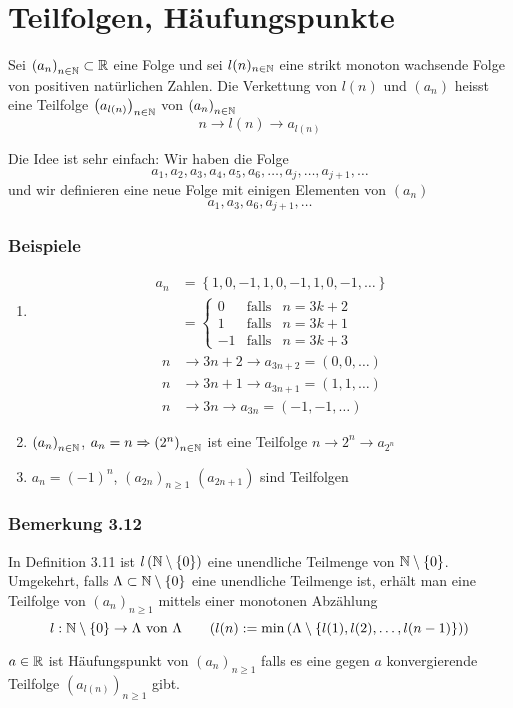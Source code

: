 \section{Teilfolgen, Häufungspunkte}
\begin{definition}{3.11}
Sei $\left( a_n\right)_{n\in\mathbb{N}}\subset\mathbb{R}$ eine Folge und sei $l(n)_{n\in\mathbb{N}}$ eine strikt monoton wachsende Folge von positiven natürlichen Zahlen. Die Verkettung von $l(n)$ und $\left( a_n\right)$ heisst eine Teilfolge $\left( a_{l(n)}\right)_{n\in\mathbb{N}}$ von $\left( a_{n}\right)_{n\in\mathbb{N}}$
\[n\to l(n)\to a_{l(n)}\]
\end{definition}
Die Idee ist sehr einfach: Wir haben die Folge \[a_1,a_2,a_3,a_4,a_5,a_6,\dots,a_j,\dots,a_{j+1},\dots \]
und wir definieren eine neue Folge mit einigen Elementen von $\left( a_n\right)$
\[a_1,a_3,a_6,a_{j+1},\dots \]

\subsubsection*{Beispiele}
\begin{enumerate}
\item \begin{align*}
{a_n} &=\left\{ {1,0, - 1,1,0, - 1,1,0, - 1, \ldots } \right\}\\
 &=\left\{ {\begin{array}{*{20}{c}}
0&{{\text{falls}}}&{n = 3k + 2}\\
1&{{\text{falls}}}&{n = 3k + 1}\\
{ - 1}&{{\text{falls}}}&{n = 3k + 3}
\end{array}} \right.
\end{align*}
\begin{align*}
n&\to 3n + 2 \to {a_{3n + 2}} = \left( {0,0, \ldots } \right)\\
n&\to 3n + 1 \to {a_{3n + 1}} = \left( {1,1, \ldots } \right)\\
n&\to 3n \to {a_{3n}} = \left( { - 1, - 1, \ldots } \right)
\end{align*}
\item $\left( a_n\right)_{n\in\mathbb{N}}$, $a_n=n\Rightarrow \left( 2^n\right)_{n\in\mathbb{N}}$ ist eine Teilfolge $n\to 2^n\to a_{2^n}$
\item $a_n=\left( -1\right)^n$, $\left( a_{2n}\right)_{n\geq 1}$ $\left( a_{2n+1}\right)$ sind Teilfolgen
\end{enumerate}

\subsubsection*{Bemerkung 3.12}
In Definition 3.11 ist $l\left( \mathbb{N}\setminus\{ 0\}\right)$ eine unendliche Teilmenge von $\mathbb{N}\setminus\{ 0\}$. Umgekehrt, falls $\Lambda\subset\mathbb{N}\setminus\{ 0\}$ eine unendliche Teilmenge ist, erhält man eine Teilfolge von $\left( a_n\right)_{n\geq 1}$ mittels einer monotonen Abzählung \[l:\mathbb{N}\setminus\{ 0\}\to\Lambda \text{ von } \Lambda \quad\quad (l(n):=\min\left( \Lambda \setminus\{ l(1),l(2),\dots ,l(n-1)\}\right)) \]
\begin{definition}{3.13}
$a\in\mathbb{R}$ ist Häufungspunkt von $\left( a_n\right)_{n\geq 1}$ falls es eine gegen $a$ konvergierende Teilfolge $\left( a_{l(n)}\right)_{n\geq 1}$ gibt.
\end{definition}

